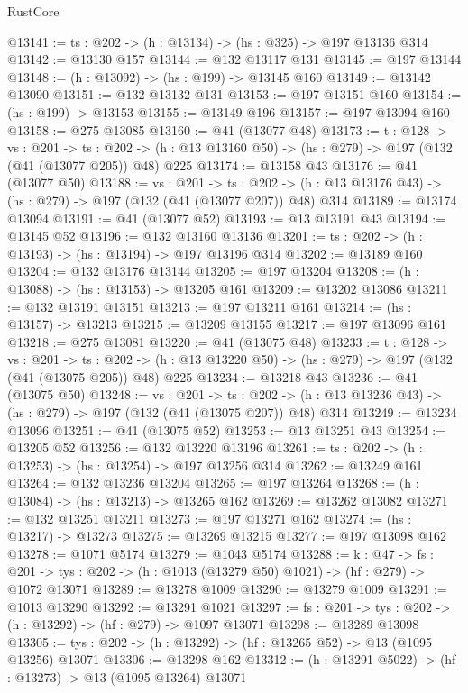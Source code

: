 \begin{lexlean}{RustCore}
\begin{coremodule}
@13141 := {ts : @202} -> (h : @13134) -> (hs : @325) -> @197 @13136 @314
@13142 := @13130 @157
@13144 := @132 @13117 @131
@13145 := @197 @13144
@13148 := (h : @13092) -> (hs : @199) -> @13145 @160
@13149 := @13142 @13090
@13151 := @132 @13132 @131
@13153 := @197 @13151 @160
@13154 := (hs : @199) -> @13153
@13155 := @13149 @196
@13157 := @197 @13094 @160
@13158 := @275 @13085
@13160 := @41 (@13077 @48)
@13173 := {t : @128} ->
  {vs : @201} ->
  {ts : @202} -> (h : @13 @13160 @50) -> (hs : @279) -> @197 (@132 (@41 (@13077 @205)) @48) @225
@13174 := @13158 @43
@13176 := @41 (@13077 @50)
@13188 := {vs : @201} ->
  {ts : @202} -> (h : @13 @13176 @43) -> (hs : @279) -> @197 (@132 (@41 (@13077 @207)) @48) @314
@13189 := @13174 @13094
@13191 := @41 (@13077 @52)
@13193 := @13 @13191 @43
@13194 := @13145 @52
@13196 := @132 @13160 @13136
@13201 := {ts : @202} -> (h : @13193) -> (hs : @13194) -> @197 @13196 @314
@13202 := @13189 @160
@13204 := @132 @13176 @13144
@13205 := @197 @13204
@13208 := (h : @13088) -> (hs : @13153) -> @13205 @161
@13209 := @13202 @13086
@13211 := @132 @13191 @13151
@13213 := @197 @13211 @161
@13214 := (hs : @13157) -> @13213
@13215 := @13209 @13155
@13217 := @197 @13096 @161
@13218 := @275 @13081
@13220 := @41 (@13075 @48)
@13233 := {t : @128} ->
  {vs : @201} ->
  {ts : @202} -> (h : @13 @13220 @50) -> (hs : @279) -> @197 (@132 (@41 (@13075 @205)) @48) @225
@13234 := @13218 @43
@13236 := @41 (@13075 @50)
@13248 := {vs : @201} ->
  {ts : @202} -> (h : @13 @13236 @43) -> (hs : @279) -> @197 (@132 (@41 (@13075 @207)) @48) @314
@13249 := @13234 @13096
@13251 := @41 (@13075 @52)
@13253 := @13 @13251 @43
@13254 := @13205 @52
@13256 := @132 @13220 @13196
@13261 := {ts : @202} -> (h : @13253) -> (hs : @13254) -> @197 @13256 @314
@13262 := @13249 @161
@13264 := @132 @13236 @13204
@13265 := @197 @13264
@13268 := (h : @13084) -> (hs : @13213) -> @13265 @162
@13269 := @13262 @13082
@13271 := @132 @13251 @13211
@13273 := @197 @13271 @162
@13274 := (hs : @13217) -> @13273
@13275 := @13269 @13215
@13277 := @197 @13098 @162
@13278 := @1071 @5174
@13279 := @1043 @5174
@13288 := {k : @47} ->
  {fs : @201} -> {tys : @202} -> (h : @1013 (@13279 @50) @1021) -> (hf : @279) -> @1072 @13071
@13289 := @13278 @1009
@13290 := @13279 @1009
@13291 := @1013 @13290
@13292 := @13291 @1021
@13297 := {fs : @201} -> {tys : @202} -> (h : @13292) -> (hf : @279) -> @1097 @13071
@13298 := @13289 @13098
@13305 := {tys : @202} -> (h : @13292) -> (hf : @13265 @52) -> @13 (@1095 @13256) @13071
@13306 := @13298 @162
@13312 := (h : @13291 @5022) -> (hf : @13273) -> @13 (@1095 @13264) @13071

\end{coremodule}
\end{lexlean}
